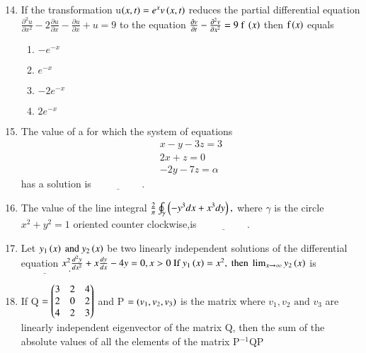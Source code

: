 \documentclass[journal]{IEEEtran}
\begin{document}
\begin{enumerate}
\setcounter{enumi}{13}

\item If the transformation u$\left(x,t\right)=e^{x}v\left(x,t\right)$ reduces the partial differential equation $\frac{\partial^{2}u}{\partial x^{2}}-2\frac{\partial u}{\partial x}-\frac{\partial u}{\partial x}+u=9$  to the equation $\frac{\partial v}{\partial t}-\frac{\partial^{2}v}{\partial x^{2}}=9 \text{ f }\left(x\right)$ then $\text{f}\left(x\right)$ equals 

\begin{multicols}{4}
    \begin{enumerate}
        \item $-e^{-x}$
        \item $e^{-x}$
        \item $-2e^{-x}$
        \item $2e^{-x}$
    \end{enumerate}
\end{multicols}

\bigskip

\item The value of a for which the system of equations 
\begin{align*}
    x-y-3z=3\\
    2x+z=0\\
    -2y-7z=\alpha
\end{align*}
has a solution is $\underline{\hspace{2cm}}.$
\bigskip

\item The value of the line integral $\frac{2}{\pi}\oint_{\gamma}\left(-y^{3}dx+x^{3}dy\right),$ where $\gamma$ is the circle $x^{2}+y^{2}=1$ oriented counter clockwise,is $\underline{\hspace{2cm}}.$
\bigskip

\item Let $y_{1}\left(x\right)\text{ and } y_{2}\left(x\right)$  be two linearly independent solutions of the differential equation $x^{2}\frac{d^{2}y}{dx^{2}}+x\frac{dy}{dx}-4y=0,x>0\text{ If } y_{1}\left(x\right)=x^{2},\text{ then }\lim_{x\to\infty}y_{2}\left(x\right)$ is $\underline{\hspace{2cm}}.$
\bigskip

\item If Q $= \begin{pmatrix}3&2&4\\2&0&2\\4&2&3\end{pmatrix} $ and P $=\left(v_{1},v_{2},v_{3}\right)$ is the matrix where $v_{1},v_{2}\text{ and }v_{3}$ are linearly independent eigenvector of the matrix Q, then the sum of the absolute values of all the elements of the matrix P$^{-1}$QP


\end{enumerate}
\end{document}
